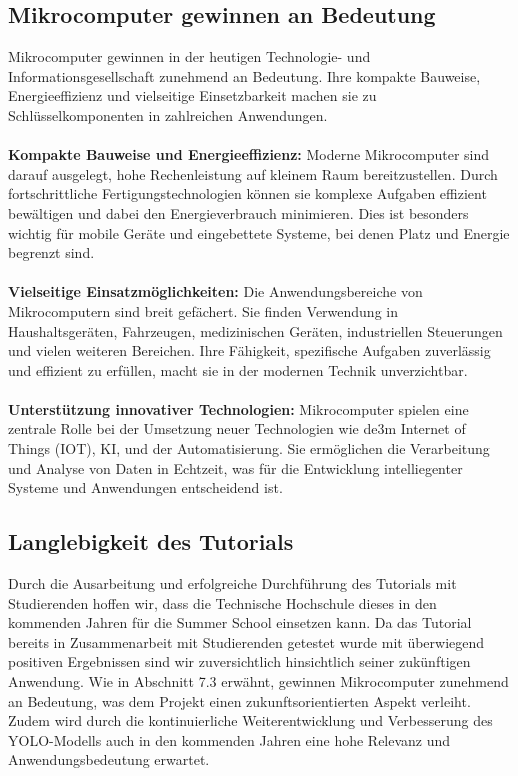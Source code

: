 \subsection{Mikrocomputer gewinnen an Bedeutung}
Mikrocomputer gewinnen in der heutigen Technologie- und Informationsgesellschaft zunehmend an Bedeutung. Ihre kompakte Bauweise, Energieeffizienz und vielseitige Einsetzbarkeit machen sie zu Schlüsselkomponenten in zahlreichen Anwendungen.\cite{WrightMicrocomputer,JerWeemeyerMicrocomputer}\\\\
\textbf{Kompakte Bauweise und Energieeffizienz:} Moderne Mikrocomputer sind darauf ausgelegt, hohe Rechenleistung auf kleinem Raum bereitzustellen. Durch fortschrittliche Fertigungstechnologien können sie komplexe Aufgaben effizient bewältigen und dabei den Energieverbrauch minimieren. Dies ist besonders wichtig für mobile Geräte und eingebettete Systeme, bei denen Platz und Energie begrenzt sind.\\\\
\textbf{Vielseitige Einsatzmöglichkeiten:} Die Anwendungsbereiche von Mikrocomputern sind breit gefächert. Sie finden Verwendung in Haushaltsgeräten, Fahrzeugen, medizinischen Geräten, industriellen Steuerungen und vielen weiteren Bereichen. Ihre Fähigkeit, spezifische Aufgaben zuverlässig und effizient zu erfüllen, macht sie in der modernen Technik unverzichtbar.\\\\
\textbf{Unterstützung innovativer Technologien:} Mikrocomputer spielen eine zentrale Rolle bei der Umsetzung neuer Technologien wie de3m Internet of Things (IOT), KI, und der Automatisierung. Sie ermöglichen die Verarbeitung und Analyse von Daten in Echtzeit, was für die Entwicklung intelliegenter Systeme und Anwendungen entscheidend ist.

\subsection{Langlebigkeit des Tutorials}
Durch die Ausarbeitung und erfolgreiche Durchführung des Tutorials mit Studierenden hoffen wir, dass die Technische Hochschule dieses in den kommenden Jahren für die Summer School einsetzen kann. Da das Tutorial bereits in Zusammenarbeit mit Studierenden getestet wurde mit überwiegend positiven Ergebnissen sind wir zuversichtlich hinsichtlich seiner zukünftigen Anwendung. Wie in Abschnitt 7.3 erwähnt, gewinnen Mikrocomputer zunehmend an Bedeutung, was dem Projekt einen zukunftsorientierten Aspekt verleiht. Zudem wird durch die kontinuierliche Weiterentwicklung und Verbesserung des YOLO-Modells auch in den kommenden Jahren eine hohe Relevanz und Anwendungsbedeutung erwartet.

